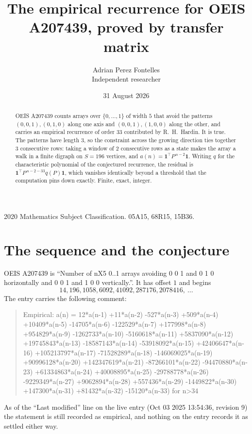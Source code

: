 \documentclass[11pt,a4paper]{article}
\title{The empirical recurrence for OEIS A207439, proved by transfer matrix}
\author{Adrian Perez Fontelles\\ \small Independent researcher}
\date{31 August 2026}
\theoremstyle{plain}
\theoremstyle{definition}
\begin{document}
\maketitle

\begin{abstract}
OEIS A207439 counts arrays over $\{0,\dots,1\}$ of width $5$ that avoid the patterns
$(0,0,1), (0,1,0)$ along one axis and $(0,0,1), (1,0,0)$ along the other, and carries an empirical recurrence of
order $33$ contributed by R.~H.~Hardin. It is true. The patterns have length $3$, so
the constraint across the growing direction ties together $3$ consecutive rows: taking a
window of $2$ consecutive rows as a state makes the array a walk in a finite digraph
on $S=196$ vertices, and $a(n)=\mathbf{1}^{\!\top}P^{\,n-2}\mathbf{1}$. Writing $q$
for the characteristic polynomial of the conjectured recurrence, the residual is
$\mathbf{1}^{\!\top}P^{\,n-2-33}q(P)\mathbf{1}$, which vanishes identically
beyond a threshold that the computation pins down exactly. Finite, exact, integer.
\end{abstract}

\noindent\small 2020 Mathematics Subject Classification. 05A15, 68R15, 15B36.\normalsize

\section{The sequence and the conjecture}

OEIS A207439 is ``Number of nX5 0..1 arrays avoiding 0 0 1 and 0 1 0 horizontally and 0 0 1 and 1 0 0 vertically.''. It has offset
$1$ and begins
\[
14, 196, 1058, 6092, 41092, 287176, 2078416,\ \dots
\]
The entry carries the following comment:
\begin{quote}\small
Empirical: a(n) = 12*a(n-1) +11*a(n-2) -527*a(n-3) +509*a(n-4) +10409*a(n-5) -14705*a(n-6) -122529*a(n-7) +177998*a(n-8) +954829*a(n-9) -1262733*a(n-10) -5160618*a(n-11) +5837090*a(n-12) +19745843*a(n-13) -18587143*a(n-14) -53918092*a(n-15) +42406647*a(n-16) +105213797*a(n-17) -71528289*a(n-18) -146069025*a(n-19) +90996128*a(n-20) +142347619*a(n-21) -87266101*a(n-22) -94470880*a(n-23) +61334863*a(n-24) +40008895*a(n-25) -29788778*a(n-26) -9229349*a(n-27) +9062894*a(n-28) +557436*a(n-29) -1449822*a(n-30) +147300*a(n-31) +81432*a(n-32) -15120*a(n-33) for n>34
\end{quote}
As of the ``Last modified'' line on the live entry (Oct 03 2025 13:54:36, revision
9) the statement is still recorded as empirical, and nothing on the entry
records it as settled either way.
\end{document}
